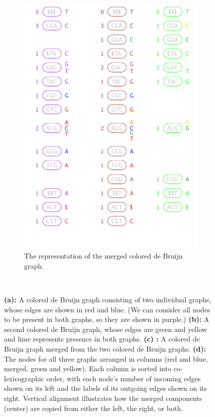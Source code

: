 \begin{figure}[h!t]
\begin{subfigure}[b]{0.45\textwidth}
\includegraphics[width=1.0\textwidth]{varimerge/newbrownmapping.pdf}
\caption{The representation of the merged colored de Bruijn graph.}
\end{subfigure}
\
\vspace{5mm}
\label{fig:brown}

\parbox{0.9\textwidth}{\caption{ {\bf (a):} A colored de Bruijn graph consisting of two individual graphs, whose edges are shown in red and blue.  (We can consider all nodes to be present in both graphs, so they are shown in purple.)  {\bf (b):} A second colored de Bruijn graph, whose edges are green and yellow and lime represents presence in both graphs.  {\bf (c) :} A colored de Bruijn graph merged from the two colored de Bruijn  graphs.  {\bf (d):} The nodes for all three graphs arranged in columns (red and blue, merged, green and yellow). Each column is sorted into co-lexicographic order, with each node's number of incoming edges shown on its left and the labels of its outgoing edges shown on its right.  Vertical alignment illustrates how the merged components (center) are copied from either the left, the right, or both.} }

\end{figure}


